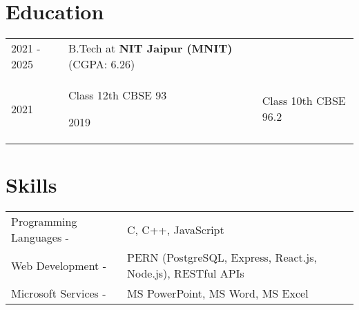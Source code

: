 \documentclass[a4paper,12pt]{article}
\begin{document}
\section{Education}
\begin{tabularx}{\linewidth}{@{}l X@{}}	

2021 - 2025 & B.Tech at \textbf{NIT Jaipur (MNIT)} \hfill (CGPA: 6.26) \\ 

2021 & Class 12th CBSE \hfill  93%

2019 & Class 10th CBSE \hfill  96.2%
\end{tabularx}


\section{Skills}
\begin{tabularx}{\linewidth}{@{}l X@{}}
Programming Languages -  &  \normalsize{C, C++, JavaScript}\\  
Web Development - &  \normalsize{PERN (PostgreSQL, Express, React.js, Node.js), RESTful APIs}\\
Microsoft Services - &  \normalsize{MS PowerPoint, MS Word, MS Excel}\\
\end{tabularx}

\vfill
\center{\footnotesize}
\end{document}
